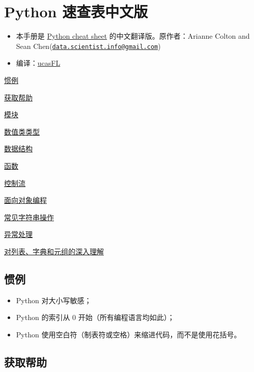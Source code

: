 \documentclass[utf-8]{ctexart}
\date{}
\begin{document}
\section{Python 速查表中文版}\label{header-n0}

\begin{itemize}
\item
  本手册是 \href{http://datasciencefree.com/python.pdf}{Python cheat
  sheet} 的中文翻译版。原作者：Arianne Colton and Sean
  Chen(\href{mailto:data.scientist.info@gmail.com}{\nolinkurl{data.scientist.info@gmail.com}})
\item
  编译：\href{https://github.com/ucasFL}{ucasFL}
\end{itemize}

\protect\hyperlink{header-n32}{惯例}

\protect\hyperlink{header-n43}{获取帮助}

\protect\hyperlink{header-n54}{模块}

\protect\hyperlink{header-n69}{数值类类型}

\protect\hyperlink{header-n128}{数据结构}

\protect\hyperlink{header-n217}{函数}

\protect\hyperlink{header-n307}{控制流}

\protect\hyperlink{header-n332}{面向对象编程}

\protect\hyperlink{header-n354}{常见字符串操作}

\protect\hyperlink{header-n357}{异常处理}

\protect\hyperlink{header-n369}{对列表、字典和元组的深入理解}

\hypertarget{header-n32}{\subsection{惯例}\label{header-n32}}

\begin{itemize}
\item
  Python 对大小写敏感；
\item
  Python 的索引从 0 开始（所有编程语言均如此）；
\item
  Python 使用空白符（制表符或空格）来缩进代码，而不是使用花括号。
\end{itemize}

\hypertarget{header-n43}{\subsection{获取帮助}\label{header-n43}}
\end{document}
